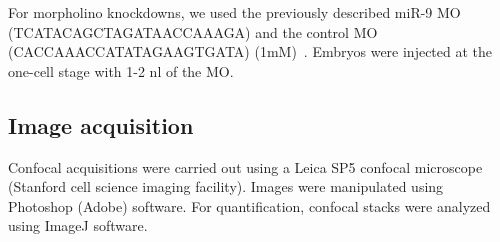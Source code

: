 For morpholino knockdowns, we used the previously described miR-9 MO
(TCATACAGCTAGATAACCAAAGA) and the control MO (CACCAAACCATATAGAAGTGATA)
(1mM)~\citep{Leucht:2008ha, Coolen:2012gj}. Embryos were
injected at the one-cell stage with 1-2 nl of the MO.

\subsection{Image acquisition}

Confocal acquisitions were carried out using a Leica SP5 confocal
microscope (Stanford cell science imaging facility). Images were
manipulated using Photoshop (Adobe) software. For quantification,
confocal stacks were analyzed using ImageJ software.
